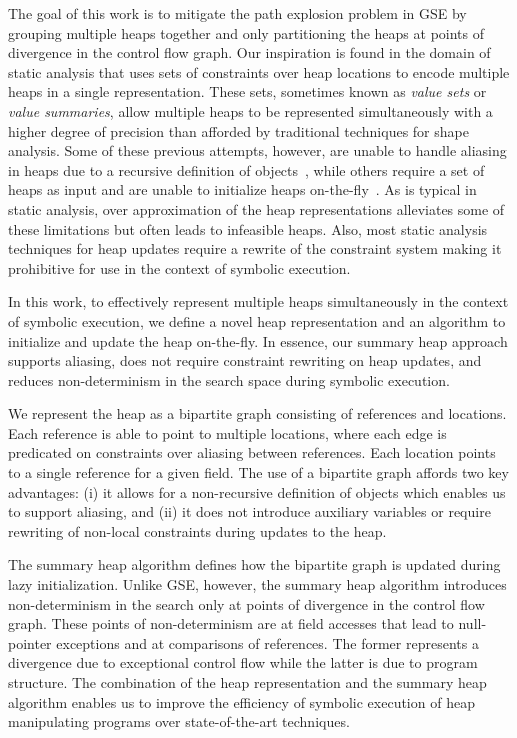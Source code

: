 The goal of this work is to mitigate the path explosion problem in GSE
by grouping multiple heaps together and only partitioning the heaps at
points of divergence in the control flow graph. Our inspiration is
found in the domain of static analysis that uses sets of constraints
over heap locations to encode multiple heaps in a single
representation. These sets, sometimes known as \emph{value sets} or
\emph{value summaries}, allow multiple heaps to be represented
simultaneously with a higher degree of precision than afforded by
traditional techniques for shape analysis. Some of these previous
attempts, however, are unable to handle aliasing in heaps due to a
recursive definition of objects~\cite{Xie:2005}, while others require
a set of heaps as input and are unable to initialize heaps
on-the-fly~\cite{Dillig:2011,Tillmann:2008}.  As is typical in static
analysis, over approximation of the heap representations alleviates
some of these limitations but often leads to infeasible heaps. Also,
most static analysis techniques for heap updates require a rewrite of
the constraint system making it prohibitive for use in the context of
symbolic execution.

In this work, to effectively represent multiple heaps simultaneously
in the context of symbolic execution, we define a novel heap
representation and an algorithm to initialize and update the heap
on-the-fly. In essence, our summary heap approach supports aliasing,
does not require constraint rewriting on heap updates, and reduces
non-determinism in the search space during symbolic execution.

We represent the heap as a bipartite graph consisting of references
and locations. Each reference is able to point to multiple locations,
where each edge is predicated on constraints over aliasing between
references. Each location points to a single reference for a given
field. The use of a bipartite graph affords two key advantages: (i) it
allows for a non-recursive definition of objects which enables us to
support aliasing, and (ii) it does not introduce auxiliary variables
or require rewriting of non-local constraints during updates to the
heap.

The summary heap algorithm defines how the bipartite graph is updated
during lazy initialization. Unlike GSE, however, the summary heap
algorithm introduces non-determinism in the search only at points of
divergence in the control flow graph. These points of non-determinism
are at field accesses that lead to null-pointer exceptions and at
comparisons of references. The former represents a divergence due to
exceptional control flow while the latter is due to program structure.
The combination of the heap representation and the summary heap
algorithm enables us to improve the efficiency of symbolic execution
of heap manipulating programs over state-of-the-art techniques.

